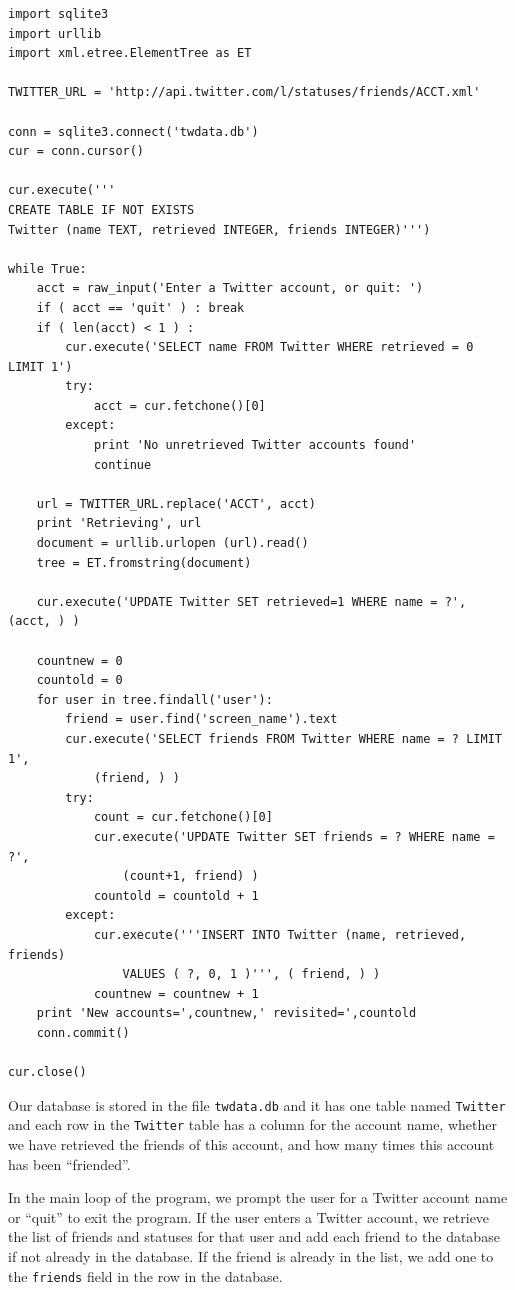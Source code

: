 \documentclass[10pt]{book}
\begin{document}
\beforeverb
\begin{verbatim}
import sqlite3
import urllib
import xml.etree.ElementTree as ET

TWITTER_URL = 'http://api.twitter.com/l/statuses/friends/ACCT.xml'

conn = sqlite3.connect('twdata.db')
cur = conn.cursor()

cur.execute('''
CREATE TABLE IF NOT EXISTS 
Twitter (name TEXT, retrieved INTEGER, friends INTEGER)''')

while True:
    acct = raw_input('Enter a Twitter account, or quit: ')
    if ( acct == 'quit' ) : break
    if ( len(acct) < 1 ) :
        cur.execute('SELECT name FROM Twitter WHERE retrieved = 0 LIMIT 1')
        try:
            acct = cur.fetchone()[0]
        except:
            print 'No unretrieved Twitter accounts found'
            continue

    url = TWITTER_URL.replace('ACCT', acct)
    print 'Retrieving', url
    document = urllib.urlopen (url).read()
    tree = ET.fromstring(document)

    cur.execute('UPDATE Twitter SET retrieved=1 WHERE name = ?', (acct, ) )

    countnew = 0
    countold = 0
    for user in tree.findall('user'):
        friend = user.find('screen_name').text
        cur.execute('SELECT friends FROM Twitter WHERE name = ? LIMIT 1', 
            (friend, ) )
        try:
            count = cur.fetchone()[0]
            cur.execute('UPDATE Twitter SET friends = ? WHERE name = ?', 
                (count+1, friend) )
            countold = countold + 1
        except:
            cur.execute('''INSERT INTO Twitter (name, retrieved, friends) 
                VALUES ( ?, 0, 1 )''', ( friend, ) )
            countnew = countnew + 1
    print 'New accounts=',countnew,' revisited=',countold
    conn.commit()

cur.close()
\end{verbatim}
\afterverb
%
Our database is stored in the file {\tt twdata.db} and it has one 
table named {\tt Twitter} and each row in the {\tt Twitter} table
has a column for the account name, whether we have retrieved the friends
of this account, and how many times this account has been ``friended''.

In the main loop of the program, we prompt the user for a Twitter
account name or ``quit'' to exit the program.  
If the user enters a Twitter account, we retrieve the 
list of friends and statuses
for that user and add each friend to the database if 
not already in the database.  If the friend is already in the list, 
we add one to the {\tt friends} field in the row in the database.
\end{document}
